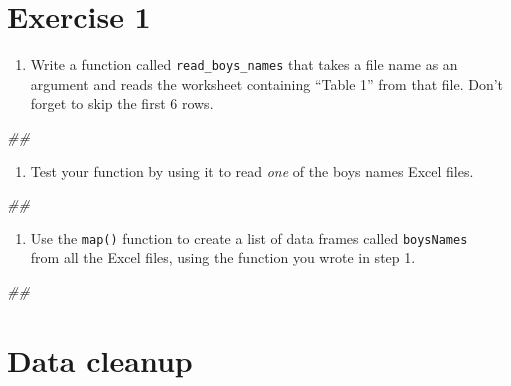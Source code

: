 \documentclass[]{book}
\newenvironment{Shaded}{\begin{snugshade}}{\end{snugshade}}
\newcommand{\CommentTok}[1]{\textcolor[rgb]{0.56,0.35,0.01}{\textit{#1}}}
\providecommand{\tightlist}{%
  \setlength{\itemsep}{0pt}\setlength{\parskip}{0pt}}
\begin{document}
\hypertarget{exercise-1-3}{%
\section{Exercise 1}\label{exercise-1-3}}

\begin{enumerate}
\def\labelenumi{\arabic{enumi}.}
\tightlist
\item
  Write a function called \texttt{read\_boys\_names} that takes a file name as an argument
  and reads the worksheet containing ``Table 1'' from that file. Don't forget
  to skip the first 6 rows.
\end{enumerate}

\begin{Shaded}
\begin{Highlighting}[]
\CommentTok{## }
\end{Highlighting}
\end{Shaded}

\begin{enumerate}
\def\labelenumi{\arabic{enumi}.}
\setcounter{enumi}{1}
\tightlist
\item
  Test your function by using it to read \emph{one} of the boys names
  Excel files.
\end{enumerate}

\begin{Shaded}
\begin{Highlighting}[]
\CommentTok{## }
\end{Highlighting}
\end{Shaded}

\begin{enumerate}
\def\labelenumi{\arabic{enumi}.}
\setcounter{enumi}{2}
\tightlist
\item
  Use the \texttt{map()} function to create a list of data frames called \texttt{boysNames}\\
  from all the Excel files, using the function you wrote in step 1.
\end{enumerate}

\begin{Shaded}
\begin{Highlighting}[]
\CommentTok{## }
\end{Highlighting}
\end{Shaded}

\hypertarget{data-cleanup}{%
\section{Data cleanup}\label{data-cleanup}}
\end{document}
